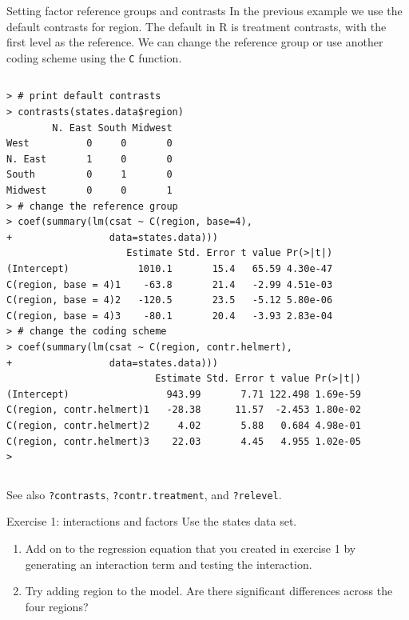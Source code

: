 \documentclass[table,smaller]{beamer}
\begin{document}
\begin{frame}[fragile,label=sec-3-3]{Setting factor reference groups and contrasts}
 In the previous example we use the default contrasts for region. The default in R is treatment contrasts, with the first level as the reference. We can change the reference group or use another coding scheme using the \texttt{C} function.

\vspace{-.5em}
\begin{columns}
\begin{block}{}
\begin{verbatim}
> # print default contrasts
> contrasts(states.data$region)
        N. East South Midwest
West          0     0       0
N. East       1     0       0
South         0     1       0
Midwest       0     0       1
> # change the reference group
> coef(summary(lm(csat ~ C(region, base=4),
+                 data=states.data)))
                     Estimate Std. Error t value Pr(>|t|)
(Intercept)            1010.1       15.4   65.59 4.30e-47
C(region, base = 4)1    -63.8       21.4   -2.99 4.51e-03
C(region, base = 4)2   -120.5       23.5   -5.12 5.80e-06
C(region, base = 4)3    -80.1       20.4   -3.93 2.83e-04
> # change the coding scheme
> coef(summary(lm(csat ~ C(region, contr.helmert),
+                 data=states.data)))
                          Estimate Std. Error t value Pr(>|t|)
(Intercept)                 943.99       7.71 122.498 1.69e-59
C(region, contr.helmert)1   -28.38      11.57  -2.453 1.80e-02
C(region, contr.helmert)2     4.02       5.88   0.684 4.98e-01
C(region, contr.helmert)3    22.03       4.45   4.955 1.02e-05
>
\end{verbatim}
\end{block}
\end{columns}
\vspace{.5em}

See also \texttt{?contrasts}, \texttt{?contr.treatment}, and \texttt{?relevel}.
\end{frame}

\begin{frame}[label=sec-3-4]{Exercise 1: interactions and factors}
Use the states data set.

\begin{enumerate}
\item Add on to the regression equation that you created in exercise 1 by generating an interaction term and testing the interaction.

\item Try adding region to the model. Are there significant differences across the four regions?
\end{enumerate}
\end{frame}
\end{document}
